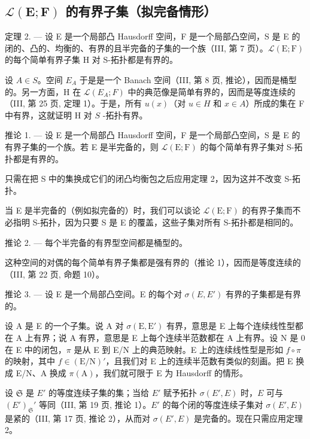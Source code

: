 \subsection{\texorpdfstring{\(\mathcal{L}(\mathbf{E};\mathbf{F})\) 的有界子集（拟完备情形）}{\textbackslash mathcal\{L\}(\textbackslash mathbf\{E\};\textbackslash mathbf\{F\}) 的有界子集（拟完备情形）}}

定理 2. --- 设 E 是一个局部凸 Hausdorff 空间，F 是一个局部凸空间，S 是 E 的闭的、凸的、均衡的、有界的且半完备的子集的一个族（III, 第 7 页）。\(\mathcal{L}(\mathrm{E};\mathrm{F})\) 的每个简单有界子集 H 对 S-拓扑都是有界的。

设 \(A \in S\)。空间 \(E_A\) 于是是一个 Banach 空间（III, 第 8 页, 推论），因而是桶型的。另一方面，H 在 \(\mathcal{L}(E_A; F)\) 中的典范像是简单有界的，因而是等度连续的（III, 第 25 页, 定理 1）。于是，所有 \(u(x)\)（对 \(u \in H\) 和 \(x \in A\)）所成的集在 F 中有界，这就证明 H 对 \(S\) -拓扑有界。

推论 1. --- 设 E 是一个局部凸 Hausdorff 空间，F 是一个局部凸空间，S 是 E 的有界子集的一个族。若 E 是半完备的，则 \(\mathcal{L}(\mathrm{E};\mathrm{F})\) 的每个简单有界子集对 S-拓扑都是有界的。

只需在把 S 中的集换成它们的闭凸均衡包之后应用定理 2，因为这并不改变 S-拓扑。

当 E 是半完备的（例如拟完备的）时，我们可以谈论 \(\mathcal{L}(\mathrm{E};\mathrm{F})\) 的有界子集而不必指明 S-拓扑，因为只要 S 是 E 的覆盖，这些子集对所有 S-拓扑都是相同的。

推论 2. --- 每个半完备的有界型空间都是桶型的。

这种空间的对偶的每个简单有界子集都是强有界的（推论 1），因而是等度连续的（III, 第 22 页, 命题 10）。

推论 3. --- 设 E 是一个局部凸空间。E 的每个对 \(\sigma(E, E')\) 有界的子集都是有界的。

设 A 是 E 的一个子集。说 A 对 \(\sigma(\mathrm{E}, \mathrm{E}')\) 有界，意思是 E 上每个连续线性型都在 A 上有界；说 A 有界，意思是 E 上每个连续半范数都在 A 上有界。设 N 是 0 在 E 中的闭包，\(\pi\) 是从 E 到 E/N 上的典范映射。E 上的连续线性型是形如 \(f \circ \pi\) 的映射，其中 \(f \in (\mathrm{E}/\mathrm{N})'\)，且我们对 E 上的连续半范数有类似的刻画。把 E 换成 E/N、A 换成 \(\pi(\mathrm{A})\)，我们就可限于 E 为 Hausdorff 的情形。

设 \(\mathfrak{S}\) 是 \(E'\) 的等度连续子集的集；当给 \(E'\) 赋予拓扑 \(\sigma(E', E)\) 时，\(E\) 可与 \((E')_{\mathfrak{S}}'\) 等同（III, 第 19 页, 推论 1）。\(E'\) 的每个闭的等度连续子集对 \(\sigma(E', E)\) 是紧的（III, 第 17 页, 推论 2），从而对 \(\sigma(E', E)\) 是完备的。现在只需应用定理 2。

